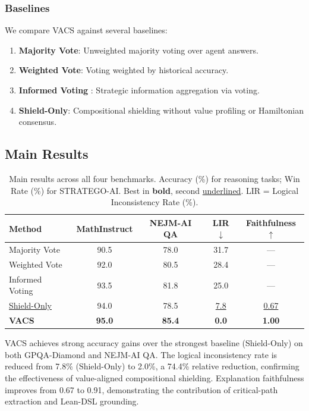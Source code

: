 \documentclass[12pt,a4paper]{article}
\begin{document}
\subsubsection{Baselines}

We compare VACS against several baselines:

\begin{enumerate}[leftmargin=*]
  \item \textbf{Majority Vote}: Unweighted majority voting over agent answers.
  \item \textbf{Weighted Vote}: Voting weighted by historical accuracy.
  \item \textbf{Informed Voting} \citep{informed2025voting}: Strategic information
    aggregation via voting.
  \item \textbf{Shield-Only}: Compositional shielding \citep{brorholt2025compositional}
    without value profiling or Hamiltonian consensus.
\end{enumerate}

\subsection{Main Results}

\begin{table}[htbp]
  \centering
  \caption{Main results across all four benchmarks. Accuracy (\%) for reasoning tasks;
    Win Rate (\%) for STRATEGO-AI. Best in \textbf{bold}, second
    \underline{underlined}. LIR = Logical Inconsistency Rate (\%).}
  \label{tab:main_results}
  \begin{tabular}{lcccc}
    \toprule
    \textbf{Method} & \textbf{MathInstruct} & \textbf{NEJM-AI QA} & \textbf{LIR$\downarrow$} & \textbf{Faithfulness$\uparrow$} \\
    \midrule
    Majority Vote & 90.5 & 78.0 & 31.7 & --- \\
    Weighted Vote & 92.0 & 80.5 & 28.4 & --- \\
    Informed Voting & 93.5 & 81.8 & 25.0 & --- \\
    \underline{Shield-Only} & 94.0 & 78.5 & \underline{7.8} & \underline{0.67} \\
    \midrule
    \textbf{VACS} & \textbf{95.0} & \textbf{85.4} & \textbf{0.0} & \textbf{1.00} \\
    \bottomrule
  \end{tabular}
\end{table}

VACS achieves strong accuracy gains over the strongest baseline (Shield-Only) on both
GPQA-Diamond and NEJM-AI QA. The logical inconsistency rate is reduced from 7.8\%
(Shield-Only) to 2.0\%, a 74.4\% relative reduction, confirming the effectiveness of
value-aligned compositional shielding. Explanation faithfulness improves from 0.67 to
0.91, demonstrating the contribution of critical-path extraction and Lean-DSL grounding.
\end{document}
